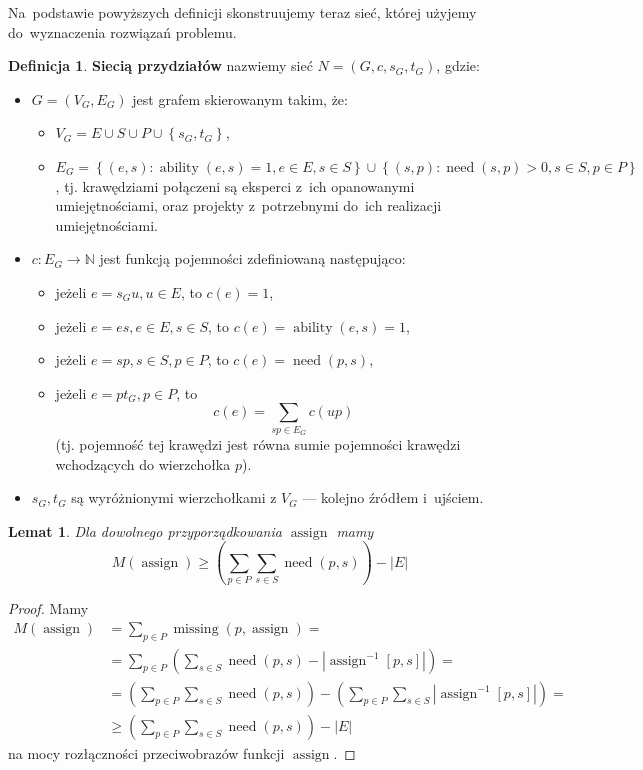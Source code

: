 \documentclass[12pt,a4paper]{article}
\newtheorem{lem}{Lemat}
\theoremstyle{definition}
\newtheorem{defn}{Definicja}
\DeclareMathOperator{\ability}{ability}
\DeclareMathOperator{\need}{need}
\DeclareMathOperator{\assign}{assign}
\DeclareMathOperator{\missing}{missing}
\begin{document}
\noindent
Na~podstawie powyższych definicji skonstruujemy teraz sieć, której użyjemy
do~wyznaczenia rozwiązań problemu.

\begin{defn}
\textbf{Siecią przydziałów} nazwiemy sieć $N = \left(G,c,s_G,t_G\right)$, gdzie:
\begin{itemize}
	\item $G = \left(V_G,E_G\right)$ jest grafem skierowanym takim, że:
	\begin{itemize}
		\item $V_G = E \cup S \cup P \cup \left\lbrace s_G,t_G \right\rbrace$,
		\item $E_G = \left\lbrace (e,s) : \ability(e,s) = 1, e \in E, s \in S
		\right\rbrace \cup \left\lbrace (s,p) : \need(s,p) > 0, s \in S, p \in P
		\right\rbrace$, tj. krawędziami połączeni są eksperci z~ich opanowanymi
		umiejętnościami, oraz projekty z~potrzebnymi do~ich realizacji
		umiejętnościami.
	\end{itemize}
	\item $c : E_G \to \mathbb{N}$ jest funkcją pojemności zdefiniowaną
	następująco:
	\begin{itemize}
		\item jeżeli $e = s_G u, u \in E$, to $c(e) = 1$,
		\item jeżeli $e = es, e \in E, s \in S$, to $c(e) = \ability(e,s) = 1$,
		\item jeżeli $e = sp, s \in S, p \in P$, to $c(e) = \need(p,s)$,
		\item jeżeli $e = pt_G, p \in P$, to
		$$c(e) = \sum_{sp \in E_G} c(up)$$
		(tj. pojemność tej krawędzi jest równa sumie pojemności krawędzi
		wchodzących do wierzchołka $p$).
	\end{itemize}
	\item $s_G,t_G$ są wyróżnionymi wierzchołkami z $V_G$ --- kolejno źródłem
	i~ujściem.
\end{itemize}
\end{defn}

\begin{lem}
Dla dowolnego przyporządkowania $\assign$ mamy
$$ M(\assign) \geq \left( \sum_{p \in P} \sum_{s \in S} \need(p,s) \right)
- |E| $$
\end{lem}

\begin{proof}
Mamy
\begin{align*}
M(\assign) &= \sum_{p \in P} \missing(p, \assign) = \\
&= \sum_{p \in P} \left( \sum_{s \in S} \need(p,s) -
\left| \assign^{-1}[p,s] \right| \right) = \\
&= \left( \sum_{p \in P} \sum_{s \in S} \need(p,s) \right) -
\left(\sum_{p \in P} \sum_{s \in S} \left| \assign^{-1}[p,s] \right|\right) = \\
&\geq \left( \sum_{p \in P} \sum_{s \in S} \need(p,s) \right) - |E|
\end{align*}
na mocy rozłączności przeciwobrazów funkcji $\assign$.
\end{proof}
\end{document}
